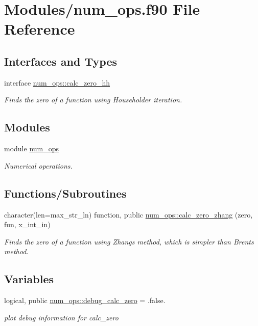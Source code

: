 \hypertarget{num__ops_8f90}{}\section{Modules/num\+\_\+ops.f90 File Reference}
\label{num__ops_8f90}
\subsection*{Interfaces and Types}
\begin{DoxyCompactItemize}
\item 
interface \hyperlink{interfacenum__ops_1_1calc__zero__hh}{num\+\_\+ops\+::calc\+\_\+zero\+\_\+hh}
\begin{DoxyCompactList}\small\item\em Finds the zero of a function using Householder iteration. \end{DoxyCompactList}\end{DoxyCompactItemize}
\subsection*{Modules}
\begin{DoxyCompactItemize}
\item 
module \hyperlink{namespacenum__ops}{num\+\_\+ops}
\begin{DoxyCompactList}\small\item\em Numerical operations. \end{DoxyCompactList}\end{DoxyCompactItemize}
\subsection*{Functions/\+Subroutines}
\begin{DoxyCompactItemize}
\item 
character(len=max\+\_\+str\+\_\+ln) function, public \hyperlink{namespacenum__ops_adcc4eacf15c931744316a004f4448b90}{num\+\_\+ops\+::calc\+\_\+zero\+\_\+zhang} (zero, fun, x\+\_\+int\+\_\+in)
\begin{DoxyCompactList}\small\item\em Finds the zero of a function using Zhang\textquotesingle{}s method, which is simpler than Brent\textquotesingle{}s method. \end{DoxyCompactList}\end{DoxyCompactItemize}
\subsection*{Variables}
\begin{DoxyCompactItemize}
\item 
logical, public \hyperlink{namespacenum__ops_aca06cb91f215c46429e23fbaf8611e5a}{num\+\_\+ops\+::debug\+\_\+calc\+\_\+zero} = .false.
\begin{DoxyCompactList}\small\item\em plot debug information for calc\+\_\+zero \end{DoxyCompactList}\end{DoxyCompactItemize}
